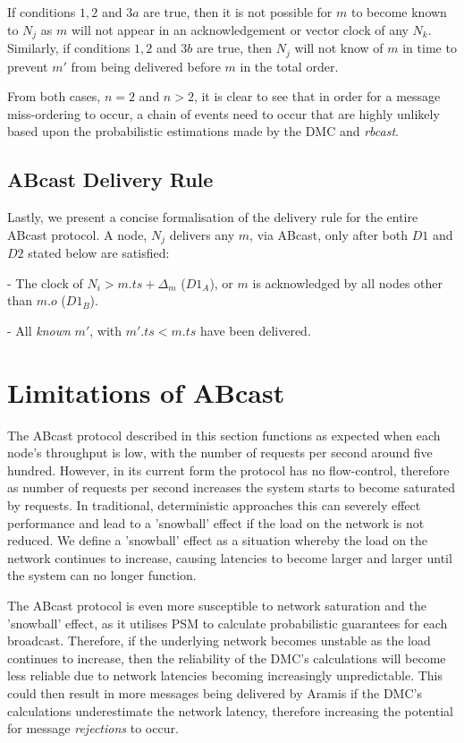         If conditions $1,2$ and $3a$ are true, then it is not possible for $m$ to become known to $N_j$ as $m$ will not appear in an acknowledgement or vector clock of any $N_k$.  Similarly, if conditions $1,2$ and $3b$ are true, then $N_j$ will not know of $m$ in time to prevent $m'$ from being delivered before $m$ in the total order.  
        
        From both cases, $n=2$ and $n>2$, it is clear to see that in order for a message miss-ordering to occur, a chain of events need to occur that are highly unlikely based upon the probabilistic estimations made by the DMC and \emph{rbcast}.  
        		
    \subsection{ABcast Delivery Rule}
    Lastly, we present a concise formalisation of the delivery rule for the entire \textsf{ABcast} protocol.  A node, $N_j$ delivers any $m$, via \textsf{ABcast}, only after both $D1$ and $D2$ stated below are satisfied:
	    \begin{description}[labelindent=1cm]
	        \item[$\boldsymbol{D1}$] - The clock of $N_i > m.ts + \Delta_{m}$ ($D1_A$), or $m$ is acknowledged by all nodes other than $m.o$ ($D1_B$). 
	        \item[$\boldsymbol{D2}$] - All \emph{known} $m'$, with $m'.ts < m.ts$ have been delivered.
	    \end{description}
	    
\section{Limitations of ABcast}
The \textsf{ABcast} protocol described in this section functions as expected when each node's throughput is low, with the number of requests per second around five hundred.  However, in its current form the protocol has no flow-control, therefore as number of requests per second increases the system starts to become saturated by requests.  In traditional, deterministic approaches this can severely effect performance and lead to a 'snowball' effect if the load on the network is not reduced.  We define a 'snowball' effect as a situation whereby the load on the network continues to increase, causing latencies to become larger and larger until the system can no longer function.  

The \textsf{ABcast} protocol is even more susceptible to network saturation and the 'snowball' effect, as it utilises PSM to calculate probabilistic guarantees for each broadcast. Therefore, if the underlying network becomes unstable as the load continues to increase, then the reliability of the DMC's calculations will become less reliable due to network latencies becoming increasingly unpredictable.  This could then result in more messages being delivered by \textsf{Aramis} if the DMC's calculations underestimate the network latency, therefore increasing the potential for message \emph{rejections} to occur.  

